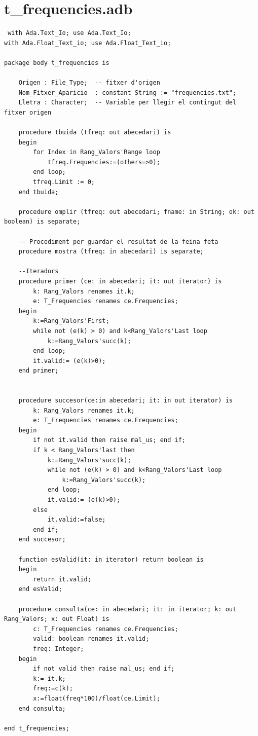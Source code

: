 \documentclass[a4paper,12pt]{article}
\begin{document}
\section{t\_frequencies.adb}
\begin{lstlisting}
 with Ada.Text_Io; use Ada.Text_Io;
with Ada.Float_Text_io; use Ada.Float_Text_io;

package body t_frequencies is 

	Origen : File_Type;  -- fitxer d'origen
	Nom_Fitxer_Aparicio  : constant String := "frequencies.txt";
	Lletra : Character;  -- Variable per llegir el contingut del fitxer origen
	
	procedure tbuida (tfreq: out abecedari) is
	begin
		for Index in Rang_Valors'Range loop
			tfreq.Frequencies:=(others=>0);
		end loop;
		tfreq.Limit := 0;
	end tbuida;
   
	procedure omplir (tfreq: out abecedari; fname: in String; ok: out boolean) is separate;
   
	-- Procediment per guardar el resultat de la feina feta
	procedure mostra (tfreq: in abecedari) is separate;
	
	--Iteradors
	procedure primer (ce: in abecedari; it: out iterator) is
		k: Rang_Valors renames it.k;
		e: T_Frequencies renames ce.Frequencies;
	begin
		k:=Rang_Valors'First;
		while not (e(k) > 0) and k<Rang_Valors'Last loop
			k:=Rang_Valors'succ(k);
		end loop;
		it.valid:= (e(k)>0);
	end primer;	
	
	
	procedure succesor(ce:in abecedari; it: in out iterator) is
		k: Rang_Valors renames it.k;
		e: T_Frequencies renames ce.Frequencies;
	begin
		if not it.valid then raise mal_us; end if;
		if k < Rang_Valors'last then
			k:=Rang_Valors'succ(k);
			while not (e(k) > 0) and k<Rang_Valors'Last loop
				k:=Rang_Valors'succ(k);
			end loop;
			it.valid:= (e(k)>0);
		else
			it.valid:=false;
		end if;
	end succesor;
	
	function esValid(it: in iterator) return boolean is
	begin
		return it.valid;
	end esValid;
	
	procedure consulta(ce: in abecedari; it: in iterator; k: out Rang_Valors; x: out Float) is
		c: T_Frequencies renames ce.Frequencies;
		valid: boolean renames it.valid;
		freq: Integer;
	begin
		if not valid then raise mal_us; end if;
		k:= it.k; 
		freq:=c(k);
		x:=float(freq*100)/float(ce.Limit);
	end consulta;
	
end t_frequencies;

\end{lstlisting}
\end{document}

